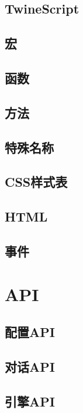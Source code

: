 \documentclass[hyperref,UTF8]{ctexart}
\begin{document}
\newpage
\subsection{TwineScript}

\newpage
\subsection{宏}

\newpage
\subsection{函数}

\newpage
\subsection{方法}

\newpage
\subsection{特殊名称}

\newpage
\subsection{CSS样式表}

\newpage
\subsection{HTML}

\newpage
\subsection{事件}

\newpage
\section{API}
\subsection{配置API}

\newpage
\subsection{对话API}

\newpage
\subsection{引擎API}
\end{document}
